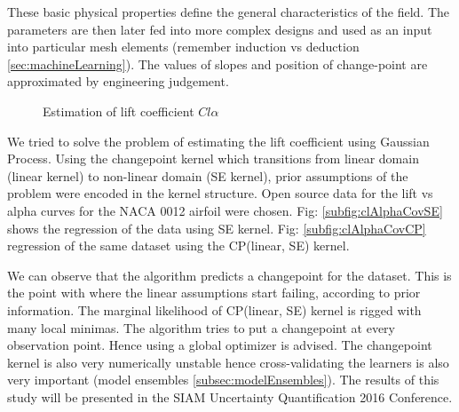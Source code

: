 These basic physical properties define the general characteristics of the field. The parameters are then later fed into more complex designs and used as an input into particular mesh elements (remember induction vs deduction \ref{sec:machineLearning}). The values of slopes and position of change-point are approximated by engineering judgement. 

\begin{figure}[!ht]
  \centering
	    \quad
	    \caption{Estimation of lift coefficient $Cl\alpha$}
\end{figure}


We tried to solve the problem of estimating the lift coefficient using Gaussian Process. Using the changepoint kernel which transitions from linear domain (linear kernel) to non-linear domain (SE kernel), prior assumptions of the problem were encoded in the kernel structure. Open source data for the lift vs alpha curves for the NACA 0012 airfoil were chosen. Fig: \ref{subfig:clAlphaCovSE} shows the regression of the data using SE kernel. Fig: \ref{subfig:clAlphaCovCP} regression of the same dataset using the CP(linear, SE) kernel. 

We can observe that the algorithm predicts a changepoint for the dataset. This is the point with where the linear assumptions start failing, according to prior information. The marginal likelihood of CP(linear, SE) kernel is rigged with many local minimas. The algorithm tries to put a changepoint at every observation point. Hence using a global optimizer is advised. The changepoint kernel is also very numerically unstable hence cross-validating the learners is also very important (model ensembles \ref{subsec:modelEnsembles}). The results of this study will be presented in the SIAM Uncertainty Quantification 2016 Conference.


